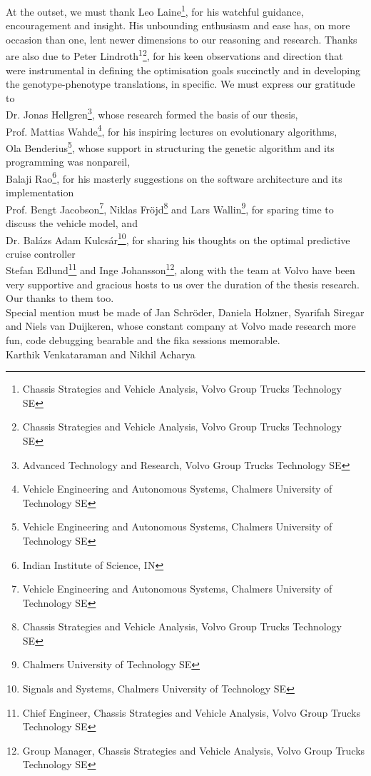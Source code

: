 At the outset, we must thank Leo Laine\footnote{Chassis Strategies and Vehicle Analysis, Volvo Group Trucks Technology SE}, for his watchful guidance, encouragement and insight. His unbounding enthusiasm and ease has, on more occasion than one, lent newer dimensions to our reasoning and research. Thanks are also due to Peter Lindroth\textsuperscript{1}\footnote{Chassis Strategies and Vehicle Analysis, Volvo Group Trucks Technology SE}, for his keen observations and direction that were instrumental in defining the optimisation goals succinctly and in developing the genotype-phenotype translations, in specific. We must express our gratitude to\\

Dr. Jonas Hellgren\footnote{Advanced Technology and Research, Volvo Group Trucks Technology SE}, whose research formed the basis of our thesis,\\ 

Prof. Mattias Wahde\footnote{Vehicle Engineering and Autonomous Systems, Chalmers University of Technology SE}, for his inspiring lectures on evolutionary algorithms,\\

Ola Benderius\footnote{Vehicle Engineering and Autonomous Systems, Chalmers University of Technology SE}, whose support in structuring the genetic algorithm and its programming was nonpareil,\\ 

Balaji Rao\footnote{Indian Institute of Science, IN}, for his masterly suggestions on the software architecture and its implementation\\

Prof. Bengt Jacobson\footnote{Vehicle Engineering and Autonomous Systems, Chalmers University of Technology SE}, Niklas Fr\"ojd\footnote{Chassis Strategies and Vehicle Analysis, Volvo Group Trucks Technology SE} and Lars Wallin\footnote{Chalmers University of Technology SE}, for sparing time to discuss the vehicle model, and\\

Dr. Bal\'azs Adam Kulcs\'ar\footnote{Signals and Systems, Chalmers University of Technology SE}, for sharing his thoughts on the optimal predictive cruise controller\\

Stefan Edlund\footnote{Chief Engineer, Chassis Strategies and Vehicle Analysis, Volvo Group Trucks Technology SE} and Inge Johansson\footnote{Group Manager, Chassis Strategies and Vehicle Analysis, Volvo Group Trucks Technology SE}, along with the team at Volvo have been very supportive and gracious hosts to us over the duration of the thesis research. Our thanks to them too.\\

Special mention must be made of Jan Schr\"oder, Daniela Holzner, Syarifah Siregar and Niels van Duijkeren, whose constant company at Volvo made research more fun, code debugging bearable and the fika sessions memorable.\\

Karthik Venkataraman and Nikhil Acharya